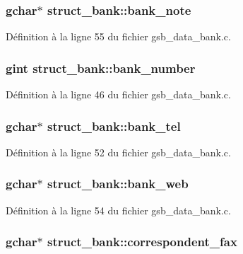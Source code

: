 \subsubsection[{bank\_\-note}]{\setlength{\rightskip}{0pt plus 5cm}gchar$\ast$ {\bf struct\_\-bank::bank\_\-note}}\label{structstruct__bank_a7151f54df1f14f3fe0910ae0ad1f28ad}


Définition à la ligne 55 du fichier gsb\_\-data\_\-bank.c.

\subsubsection[{bank\_\-number}]{\setlength{\rightskip}{0pt plus 5cm}gint {\bf struct\_\-bank::bank\_\-number}}\label{structstruct__bank_ad4c2be56c49b5e7d0cc922ff71168710}


Définition à la ligne 46 du fichier gsb\_\-data\_\-bank.c.

\subsubsection[{bank\_\-tel}]{\setlength{\rightskip}{0pt plus 5cm}gchar$\ast$ {\bf struct\_\-bank::bank\_\-tel}}\label{structstruct__bank_a2a71d4f48794f9ac4247238e6f6b9b59}


Définition à la ligne 52 du fichier gsb\_\-data\_\-bank.c.

\subsubsection[{bank\_\-web}]{\setlength{\rightskip}{0pt plus 5cm}gchar$\ast$ {\bf struct\_\-bank::bank\_\-web}}\label{structstruct__bank_a791d39b11a4fed213ef59ff1e39a7e91}


Définition à la ligne 54 du fichier gsb\_\-data\_\-bank.c.

\subsubsection[{correspondent\_\-fax}]{\setlength{\rightskip}{0pt plus 5cm}gchar$\ast$ {\bf struct\_\-bank::correspondent\_\-fax}}\label{structstruct__bank_a7fa16414e0b8cbe2b1aea88450ad12da}



